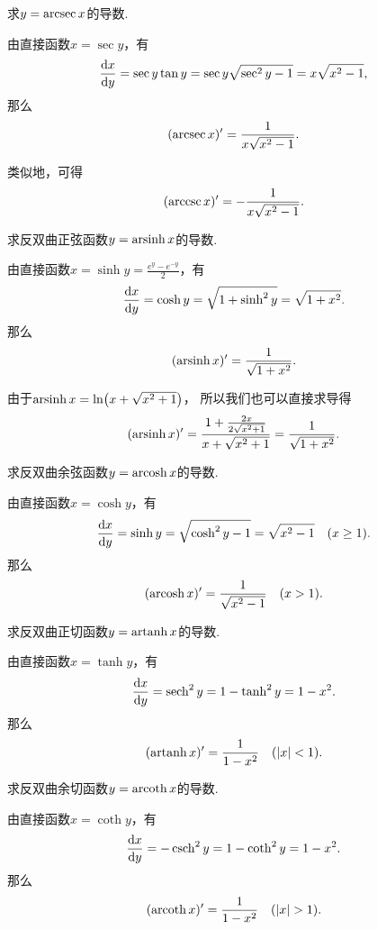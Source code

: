 \begin{example}
求\(y = \arcsec x\)的导数.
\begin{solution}
由直接函数\(x=\sec y\)，有\[
	\dv{x}{y}
	= \sec y \tan y
	= \sec y \sqrt{\sec^2 y-1}
	= x \sqrt{x^2-1},
\]
那么\[
	(\arcsec x)'
	= \frac1{x \sqrt{x^2-1}}.
\]
\end{solution}
\end{example}

类似地，可得\[
	(\arccsc x)'
	= -\frac1{x \sqrt{x^2-1}}.
\]

\begin{example}
求反双曲正弦函数\(y = \operatorname{arsinh} x\)的导数.
\begin{solution}
由直接函数\(x = \sinh y = \frac{e^y - e^{-y}}2\)，有\[
	\dv{x}{y}
	= \cosh y
	= \sqrt{1 + \sinh^2 y}
	= \sqrt{1 + x^2}.
\]
那么\[
	(\operatorname{arsinh} x)' = \frac1{\sqrt{1+x^2}}.
\]
\end{solution}
\end{example}
\begin{remark}
由于\(\operatorname{arsinh} x = \ln(x+\sqrt{x^2+1})\)，
所以我们也可以直接求导得\begin{equation*}
	(\operatorname{arsinh} x)' = \frac{1+\frac{2x}{2\sqrt{x^2+1}}}{x+\sqrt{x^2+1}}
	= \frac1{\sqrt{1+x^2}}.
\end{equation*}
\end{remark}

\begin{example}
求反双曲余弦函数\(y = \operatorname{arcosh} x\)的导数.
\begin{solution}
由直接函数\(x = \cosh y\)，有\[
	\dv{x}{y}
	= \sinh y
	= \sqrt{\cosh^2 y - 1}
	= \sqrt{x^2 - 1}
	\quad(x\geq1).
\]
那么\[
	(\operatorname{arcosh} x)' = \frac1{\sqrt{x^2-1}}
	\quad(x>1).
\]
\end{solution}
\end{example}

\begin{example}
求反双曲正切函数\(y = \operatorname{artanh} x\)的导数.
\begin{solution}
由直接函数\(x = \tanh y\)，有\[
	\dv{x}{y}
	= \sech^2 y
	= 1 - \tanh^2 y
	= 1 - x^2.
\]
那么\[
	(\operatorname{artanh} x)' = \frac1{1-x^2}
	\quad(\abs{x}<1).
\]
\end{solution}
\end{example}

\begin{example}
求反双曲余切函数\(y = \operatorname{arcoth} x\)的导数.
\begin{solution}
由直接函数\(x = \coth y\)，有\[
	\dv{x}{y} = -\csch^2 y
	= 1 - \coth^2 y
	= 1 - x^2.
\]
那么\[
	(\operatorname{arcoth} x)' = \frac1{1-x^2}
	\quad(\abs{x}>1).
\]
\end{solution}
\end{example}

